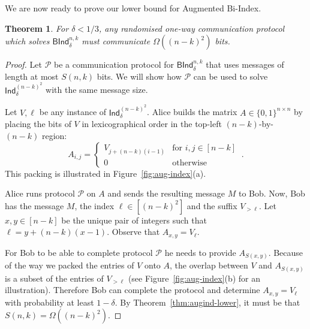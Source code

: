 \documentclass[10pt,a4paper]{article}
\newtheorem{theorem}{Theorem}
\begin{document}
%



%

We are now ready to prove our lower bound for \textsf{Augmented Bi-Index}.
\begin{theorem}\label{thm:bind-lower}
    For $\delta < 1/3$, any randomised one-way communication protocol which solves $\textsf{BInd}^{n,k}_\delta$ must communicate $\Omega((n-k)^2)$ bits.
\end{theorem}
\begin{proof}
    Let $\mathcal{P}$ be a communication protocol for $\textsf{BInd}^{n,k}_\delta$ that uses messages of length at most 
    $S(n, k)$ bits. We will show how $\mathcal{P}$ can be used to solve $\textsf{Ind}^{(n-k)^2}_\delta$ with the same message size.
    
    Let $V, \ell$ be any instance of $\textsf{Ind}^{(n-k)^2}_\delta$. Alice builds the matrix $A \in \{ 0, 1 \}^{n \times n}$ by placing the bits of $V$ in lexicographical order in the top-left $(n-k)$-by-$(n-k)$ region:
    \[
        A_{i,j} =   \begin{cases}
                        V_{j+(n-k)(i-1)} &\text{for } i,j \in [n-k]\\
                        0 &\text{otherwise}
                    \end{cases} \ .
    \]    
    This packing is illustrated in Figure~\ref{fig:aug-index}(a).
    
    Alice runs protocol $\mathcal{P}$ on $A$ and sends the resulting message $M$ to Bob.    
    Now, Bob has the message $M$, the index $\ell \in [(n-k)^2]$ and the suffix $V_{>\ell}$. Let $x, y \in [n-k]$ be the unique pair of integers such that $\ell = y + (n-k)(x-1)$. Observe that $A_{x,y} = V_\ell$.
    
    For Bob to be able to complete protocol $\mathcal{P}$ he needs to provide $A_{S(x,y)}$. Because of the way we packed the entries of $V$ onto $A$, the overlap between $V$ and $A_{S(x,y)}$ is a subset of the entries of $V_{>\ell}$ (see Figure~\ref{fig:aug-index}(b) for an illustration). Therefore Bob can complete the protocol and determine $A_{x,y} = V_\ell$ with probability at least $1-\delta$.    
    By Theorem~\ref{thm:augind-lower}, it must be that $S(n, k) = \Omega((n-k)^2)$.
\end{proof}
\end{document}
